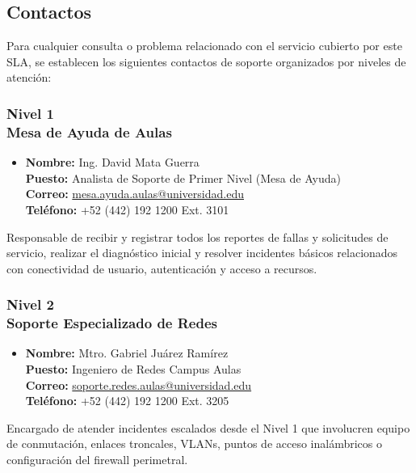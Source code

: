\subsection{Contactos}

Para cualquier consulta o problema relacionado con el servicio cubierto por este SLA, se establecen los siguientes contactos de soporte organizados por niveles de atención:

\subsubsection*{Nivel 1 \\ Mesa de Ayuda de Aulas}
\begin{itemize}
	\item \textbf{Nombre:} Ing. David Mata Guerra\\
    	\textbf{Puesto:} Analista de Soporte de Primer Nivel (Mesa de Ayuda)\\
    	\textbf{Correo:} \href{mailto:mesa.ayuda.aulas@universidad.edu}{mesa.ayuda.aulas@universidad.edu}\\
    	\textbf{Teléfono:} +52 (442) 192 1200 Ext. 3101
\end{itemize}

Responsable de recibir y registrar todos los reportes de fallas y solicitudes de servicio, realizar el diagnóstico inicial y resolver incidentes básicos relacionados con conectividad de usuario, autenticación y acceso a recursos.

\subsubsection*{Nivel 2 \\ Soporte Especializado de Redes}
\begin{itemize}
	\item \textbf{Nombre:} Mtro. Gabriel Juárez Ramírez\\
    	\textbf{Puesto:} Ingeniero de Redes Campus Aulas\\
    	\textbf{Correo:} \href{mailto:soporte.redes.aulas@universidad.edu}{soporte.redes.aulas@universidad.edu}\\
    	\textbf{Teléfono:} +52 (442) 192 1200 Ext. 3205
\end{itemize}

Encargado de atender incidentes escalados desde el Nivel 1 que involucren equipo de conmutación, enlaces troncales, VLANs, puntos de acceso inalámbricos o configuración del firewall perimetral.

